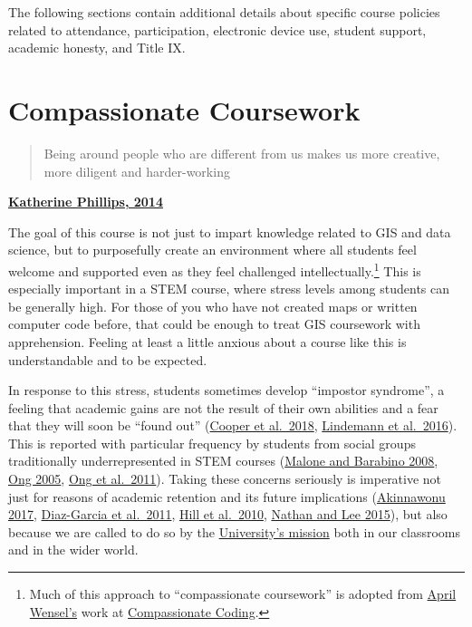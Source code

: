 \documentclass[
]{book}
\begin{document}
The following sections contain additional details about specific course policies related to attendance, participation, electronic device use, student support, academic honesty, and Title IX.

\hypertarget{compassionate-coursework}{%
\section{Compassionate Coursework}\label{compassionate-coursework}}

\begin{quote}
Being around people who are different from us makes us more creative, more diligent and harder-working
\end{quote}

\textbf{\href{https://www.scientificamerican.com/article/how-diversity-makes-us-smarter/}{Katherine Phillips, 2014}}

The goal of this course is not just to impart knowledge related to GIS and data science, but to purposefully create an environment where all students feel welcome and supported even as they feel challenged intellectually.\footnote{Much of this approach to ``compassionate coursework'' is adopted from \href{https://twitter.com/aprilwensel}{April Wensel's} work at \href{https://compassionatecoding.com}{Compassionate Coding}.} This is especially important in a STEM course, where stress levels among students can be generally high. For those of you who have not created maps or written computer code before, that could be enough to treat GIS coursework with apprehension. Feeling at least a little anxious about a course like this is understandable and to be expected.

In response to this stress, students sometimes develop ``impostor syndrome'', a feeling that academic gains are not the result of their own abilities and a fear that they will soon be ``found out'' (\href{https://www.physiology.org/doi/10.1152/advan.00085.2017}{Cooper et al.~2018}, \href{http://genderandset.open.ac.uk/index.php/genderandset/article/view/435}{Lindemann et al.~2016}). This is reported with particular frequency by students from social groups traditionally underrepresented in STEM courses (\href{https://onlinelibrary.wiley.com/doi/pdf/10.1002/sce.20307}{Malone and Barabino 2008}, \href{https://doi.org/10.1525/sp.2005.52.4.593}{Ong 2005}, \href{https://doi.org/10.17763/haer.81.2.t022245n7x4752v2}{Ong et al.~2011}). Taking these concerns seriously is imperative not just for reasons of academic retention and its future implications (\href{https://open.nytimes.com/why-having-a-diverse-team-will-make-your-products-better-c73e7518f677}{Akinnawonu 2017}, \href{https://www.tandfonline.com/doi/abs/10.5172/impp.2013.15.2.149}{Diaz-Garcia et al.~2011}, \href{https://www.aauw.org/aauw_check/pdf_download/show_pdf.php?file=why-so-few-research}{Hill et al.~2010}, \href{https://www.tandfonline.com/doi/abs/10.1111/ecge.12016}{Nathan and Lee 2015}), but also because we are called to do so by the \href{https://www.slu.edu/about/catholic-jesuit-identity/mission.php}{University's mission} both in our classrooms and in the wider world.
\end{document}
